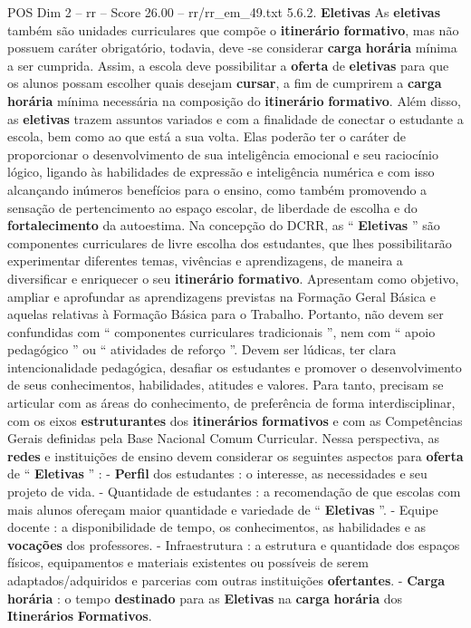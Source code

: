 \begin{textsample}{POS Dim 2 – rr – Score 26.00 – rr/rr\_em\_49.txt}  \label{ex:f2_pos_109}
5.6.2. \textbf{Eletivas} As \textbf{eletivas} também são unidades curriculares que compõe o \textbf{itinerário} \textbf{formativo}, mas não possuem caráter obrigatório, todavia, deve -se considerar \textbf{carga} \textbf{horária} mínima a ser cumprida.
Assim, a escola deve possibilitar a \textbf{oferta} de \textbf{eletivas} para que os alunos possam escolher quais desejam \textbf{cursar}, a fim de cumprirem a \textbf{carga} \textbf{horária} mínima necessária na composição do \textbf{itinerário} \textbf{formativo}.
Além disso, as \textbf{eletivas} trazem assuntos variados e com a finalidade de conectar o estudante a escola, bem como ao que está a sua volta.
Elas poderão ter o caráter de proporcionar o desenvolvimento de sua inteligência emocional e seu raciocínio lógico, ligando às habilidades de expressão e inteligência numérica e com isso alcançando inúmeros benefícios para o ensino, como também promovendo a sensação de pertencimento ao espaço escolar, de liberdade de escolha e do \textbf{fortalecimento} da autoestima.
Na concepção do DCRR, as “ \textbf{Eletivas} ” são componentes curriculares de livre escolha dos estudantes, que lhes possibilitarão experimentar diferentes temas, vivências e aprendizagens, de maneira a diversificar e enriquecer o seu \textbf{itinerário} \textbf{formativo}.
Apresentam como objetivo, ampliar e aprofundar as aprendizagens previstas na Formação Geral Básica e aquelas relativas à Formação Básica para o Trabalho.
Portanto, não devem ser confundidas com “ componentes curriculares tradicionais ”, nem com “ apoio pedagógico ” ou “ atividades de reforço ”.
Devem ser lúdicas, ter clara intencionalidade pedagógica, desafiar os estudantes e promover o desenvolvimento de seus conhecimentos, habilidades, atitudes e valores.
Para tanto, precisam se articular com as áreas do conhecimento, de preferência de forma interdisciplinar, com os eixos \textbf{estruturantes} dos \textbf{itinerários} \textbf{formativos} e com as Competências Gerais definidas pela Base Nacional Comum Curricular.
Nessa perspectiva, as \textbf{redes} e instituições de ensino devem considerar os seguintes aspectos para \textbf{oferta} de “ \textbf{Eletivas} ” : - \textbf{Perfil} dos estudantes : o interesse, as necessidades e seu projeto de vida. - Quantidade de estudantes : a recomendação de que escolas com mais alunos ofereçam maior quantidade e variedade de “ \textbf{Eletivas} ”. - Equipe docente : a disponibilidade de tempo, os conhecimentos, as habilidades e as \textbf{vocações} dos professores. - Infraestrutura : a estrutura e quantidade dos espaços físicos, equipamentos e materiais existentes ou possíveis de serem adaptados/adquiridos e parcerias com outras instituições \textbf{ofertantes}. - \textbf{Carga} \textbf{horária} : o tempo \textbf{destinado} para as \textbf{Eletivas} na \textbf{carga} \textbf{horária} dos \textbf{Itinerários} \textbf{Formativos}.

\end{textsample}
